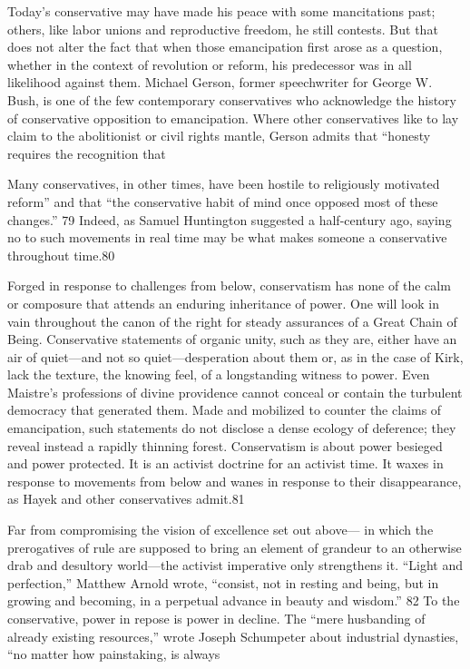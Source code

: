 Today’s conservative may have made his peace with some mancitations past; others, like labor unions and reproductive freedom, he still contests. But that does not alter the fact that when those emancipation first arose as a question, whether in the context of revolution or reform, his predecessor was in all likelihood against them. Michael Gerson, former speechwriter for George W. Bush, is one of the few contemporary conservatives who acknowledge the history of conservative opposition to emancipation. Where other conservatives like to lay claim to the abolitionist or civil rights mantle, Gerson admits that “honesty requires the recognition that
 \par 
Many conservatives, in other times, have been hostile to religiously motivated reform” and that “the conservative habit of mind once opposed most of these changes.” {\color{blue}79} Indeed, as Samuel Huntington suggested a half-century ago, saying no to such movements in real time may be what makes someone a conservative throughout time.{\color{blue}80}
 \par 
Forged in response to challenges from below, conservatism has none of the calm or composure that attends an enduring inheritance of power. One will look in vain throughout the canon of the right for steady assurances of a Great Chain of Being. Conservative statements of organic unity, such as they are, either have an air of quiet—and not so quiet—desperation about them or, as in the case of Kirk, lack the texture, the knowing feel, of a longstanding witness to power. Even Maistre’s professions of divine providence cannot conceal or contain the turbulent democracy that generated them. Made and mobilized to counter the claims of emancipation, such statements do not disclose a dense ecology of deference; they reveal instead a rapidly thinning forest. Conservatism is about power besieged and power protected. It is an activist doctrine for an activist time. It waxes in response to movements from below and wanes in response to their disappearance, as Hayek and other conservatives admit.{\color{blue}81}
 \par 
Far from compromising the vision of excellence set out above— in which the prerogatives of rule are supposed to bring an element of grandeur to an otherwise drab and desultory world—the activist imperative only strengthens it. “Light and perfection,” Matthew Arnold wrote, “consist, not in resting and being, but in growing and becoming, in a perpetual advance in beauty and wisdom.” {\color{blue}82} To the conservative, power in repose is power in decline. The “mere husbanding of already existing resources,” wrote Joseph Schumpeter about industrial dynasties, “no matter how painstaking, is always
